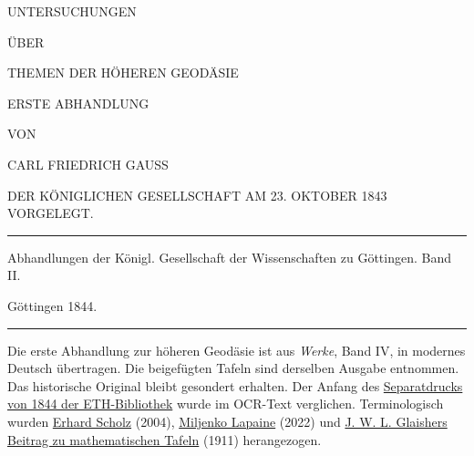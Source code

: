 \clearpage
{}
\thispagestyle{empty}
\vspace*{.3in}
\begin{center}
{\large UNTERSUCHUNGEN}\par\bigskip
ÜBER\par\bigskip
{\Large THEMEN DER HÖHEREN GEODÄSIE}\par\vspace{25pt}
ERSTE ABHANDLUNG\par\vspace{35pt}
VON\par\vspace{35pt}
{\large CARL FRIEDRICH GAUSS}\par\vspace{35pt}
{\small DER KÖNIGLICHEN GESELLSCHAFT AM 23. OKTOBER 1843 VORGELEGT.}
\end{center}
\vfill
\begin{center}
\rule{.8\linewidth}{.3pt}\par\smallskip
Abhandlungen der Königl. Gesellschaft der Wissenschaften zu Göttingen. Band II.\par
Göttingen 1844.\par\smallskip
\rule{.8\linewidth}{.3pt}
\end{center}
\par\bigskip\begingroup\fontsize{9}{11}\selectfont\raggedright\noindent Die erste Abhandlung zur höheren Geodäsie ist aus \textit{Werke}, Band IV, in modernes Deutsch übertragen. Die beigefügten Tafeln sind derselben Ausgabe entnommen. Das historische Original bleibt gesondert erhalten. Der Anfang des \href{https://doi.org/10.3931/e-rara-2860}{Separatdrucks von 1844 der ETH-Bibliothek} wurde im OCR-Text verglichen. Terminologisch wurden \href{https://arxiv.org/abs/math/0409578}{Erhard Scholz} (2004), \href{https://doi.org/10.12902/zfv-0387-2022}{Miljenko Lapaine} (2022) und \href{https://en.wikisource.org/w/index.php?oldid=12858814}{J. W. L. Glaishers Beitrag zu mathematischen Tafeln} (1911) herangezogen.\par\endgroup
\clearpage
